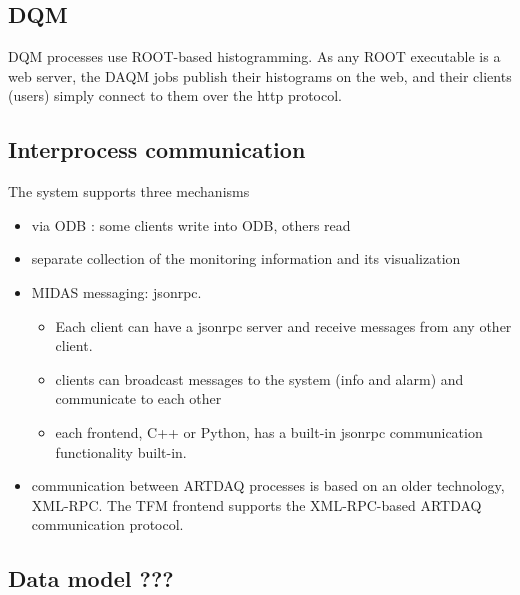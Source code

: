 \subsection{DQM}

DQM processes use ROOT-based histogramming. As any ROOT executable is a web server,
the DAQM jobs publish their histograms on the web, and their clients (users)
simply connect to them over the http protocol.

\subsection{Interprocess communication} 

The system supports three mechanisms
\begin{itemize}
\item
  via ODB : some clients write into ODB, others read
\item
  separate collection of the monitoring information and its visualization
\item
  MIDAS messaging: jsonrpc.
  \begin{itemize}
  \item
    Each client can have a jsonrpc server and receive messages
    from any other client.
  \item
    clients can broadcast messages to the system (info and alarm)
    and communicate to each other
  \item
    each frontend, C++ or Python, has a built-in jsonrpc communication
    functionality built-in.
  \end{itemize}
\item
  communication between ARTDAQ processes is based on an older technology,
  XML-RPC. The TFM frontend supports the XML-RPC-based ARTDAQ communication
  protocol.
\end{itemize}


\subsection{Data model ??? } 



